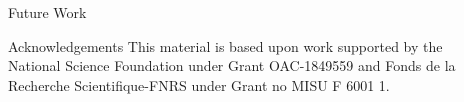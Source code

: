 \documentclass[final]{beamer}
\newlength{\sepwidth}
\newlength{\colwidth}
\newcommand{\separatorcolumn}{\begin{column}{\sepwidth}\end{column}}
\begin{document}
\begin{frame}[t]
\begin{columns}[t]
\begin{column}{\colwidth}
\begin{block}{Future Work}
\end{block}

\begin{block}{Acknowledgements}
This material is based upon work supported by the National Science Foundation under Grant OAC-1849559 and Fonds de la Recherche Scientifique-FNRS under Grant no MISU F 6001 1.
\end{block}

\end{column}

\separatorcolumn
\end{columns}
\end{frame}
\end{document}
